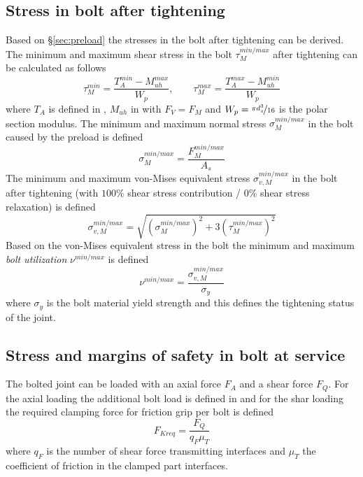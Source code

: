 \subsection{Stress in bolt after tightening}
\label{ssec:stresses}
Based on §\ref{sec:preload} the stresses in the bolt after tightening can be derived. 
The minimum and maximum shear stress in the bolt $\tau_M^{min/max}$ after tightening can be calculated
as follows
\begin{equation}
  \tau_M^{min} = \frac{T_A^{min}-M_{uh}^{max}}{W_p} , \qquad \tau_M^{max} = \frac{T_A^{max}-M_{uh}^{min}}{W_p}
  \label{equ:tau_M}
\end{equation}
where $T_A$ is defined in , $M_{uh}$ in  with $F_V=F_M$ and 
$W_p = \nicefrac{\pi d_s^3}{16}$ is the polar section modulus. The minimum and maximum normal 
stress $\sigma_M^{min/max}$ in the bolt caused by the preload is defined
\begin{equation}
  \sigma_M^{min/max} = \frac{F_M^{min/max}}{A_s}
  \label{equ:sig_M}
\end{equation}
The minimum and maximum von-Mises equivalent stress $\sigma_{v,M}^{min/max}$ in the bolt after tightening
(with $100\%$ shear stress contribution / $0\%$ shear stress relaxation) is defined 
\begin{equation}
  \sigma_{v,M}^{min/max} = \sqrt{\left(\sigma_M^{min/max}\right)^2 + 3\left(\tau_M^{min/max}\right)^2}
  \label{equ:sig_vM}
\end{equation}
Based on the von-Mises equivalent stress in the bolt the minimum and maximum 
\emph{bolt utilization} $\nu^{min/max}$ is defined
\begin{equation}
  \nu^{min/max} = \frac{\sigma_{v,M}^{min/max}}{\sigma_y}
  \label{equ:nu}
\end{equation}
where $\sigma_y$ is the bolt material yield strength and this defines the tightening status of the joint. 

\subsection{Stress and margins of safety in bolt at service}
The bolted joint can be loaded with an axial force $F_A$ and a shear force $F_Q$. For
the axial loading the additional bolt load is defined in  and for the shar loading
the required clamping force for friction grip per bolt is defined 
\begin{equation}
  F_{Kreq} = \frac{F_Q}{q_F \mu_T}
\end{equation}
where $q_F$ is the number of shear force transmitting interfaces and $\mu_T$ the coefficient of 
friction in the clamped part interfaces. 
